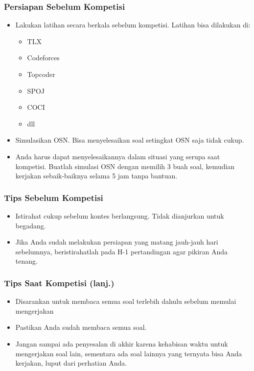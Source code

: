 \begin{frame}
  \frametitle{Persiapan Sebelum Kompetisi}
  \begin{itemize}
    \item   Lakukan latihan secara berkala sebelum kompetisi. Latihan bisa dilakukan di:
    \begin{itemize}
      \item TLX
      \item Codeforces
      \item Topcoder
      \item SPOJ
      \item COCI
      \item dll
    \end{itemize}
    \item Simulasikan OSN. Bisa menyelesaikan soal setingkat OSN saja tidak cukup.
    \item Anda harus dapat menyelesaikannya dalam situasi yang serupa saat kompetisi. Buatlah simulasi OSN dengan memilih 3 buah soal, kemudian kerjakan sebaik-baiknya selama 5 jam tanpa bantuan.
  \end{itemize}
\end{frame}

\begin{frame}
  \frametitle{Tips Sebelum Kompetisi}
  \begin{itemize}
    \item Istirahat cukup sebelum kontes berlangsung. Tidak dianjurkan untuk begadang.
    \item Jika Anda sudah melakukan persiapan yang matang jauh-jauh hari sebelumnya, beristirahatlah pada H-1 pertandingan agar pikiran Anda tenang.
  \end{itemize}
  
\end{frame}


\begin{frame}
  \frametitle{Tips Saat Kompetisi (lanj.)}
  \begin{itemize}
    \item Disarankan untuk membaca semua soal terlebih dahulu sebelum memulai mengerjakan
    \item Pastikan Anda sudah membaca semua soal.
    \item Jangan sampai ada penyesalan di akhir karena kehabisan waktu untuk mengerjakan soal lain, sementara ada soal lainnya yang ternyata bisa Anda kerjakan, luput dari perhatian Anda.
  \end{itemize}
  
\end{frame}

